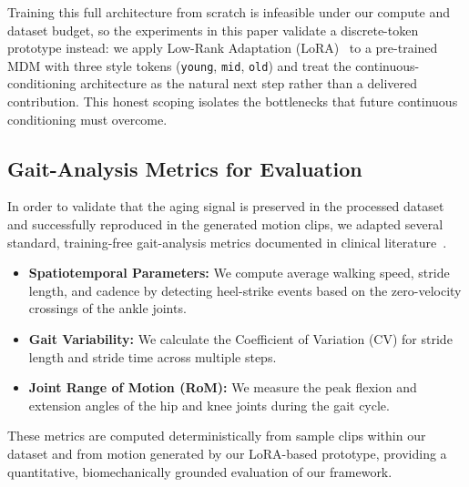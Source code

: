 Training this full architecture from scratch is infeasible under our compute and dataset budget, so the experiments in this paper validate a discrete-token prototype instead: we apply Low-Rank Adaptation (LoRA)~\cite{hu2022lora} to a pre-trained MDM with three style tokens (\texttt{young}, \texttt{mid}, \texttt{old}) and treat the continuous-conditioning architecture as the natural next step rather than a delivered contribution.
This honest scoping isolates the bottlenecks that future continuous conditioning must overcome.

\subsection{Gait-Analysis Metrics for Evaluation}
In order to validate that the aging signal is preserved in the processed dataset and successfully reproduced in the generated motion clips, we adapted several standard, training-free gait-analysis metrics documented in clinical literature~\cite{bailey2023smartwatch, cordeiro2025constraint, galasso2024development}.
\begin{itemize}
    \item \textbf{Spatiotemporal Parameters:} We compute average walking speed, stride length, and cadence by detecting heel-strike events based on the zero-velocity crossings of the ankle joints. 
    \item \textbf{Gait Variability:} We calculate the Coefficient of Variation (CV) for stride length and stride time across multiple steps. 
    \item \textbf{Joint Range of Motion (RoM):} We measure the peak flexion and extension angles of the hip and knee joints during the gait cycle. 
\end{itemize}
These metrics are computed deterministically from sample clips within our dataset and from motion generated by our LoRA-based prototype, providing a quantitative, biomechanically grounded evaluation of our framework.